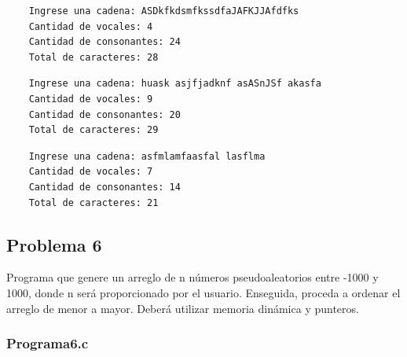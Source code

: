 \documentclass{article}
\begin{document}
	\begin{lstlisting}
	Ingrese una cadena: ASDkfkdsmfkssdfaJAFKJJAfdfks
	Cantidad de vocales: 4
	Cantidad de consonantes: 24
	Total de caracteres: 28
	\end{lstlisting}
	
	\begin{lstlisting}
	Ingrese una cadena: huask asjfjadknf asASnJSf akasfa
	Cantidad de vocales: 9
	Cantidad de consonantes: 20
	Total de caracteres: 29
	\end{lstlisting}
	
	\begin{lstlisting}
	Ingrese una cadena: asfmlamfaasfal lasflma
	Cantidad de vocales: 7
	Cantidad de consonantes: 14
	Total de caracteres: 21
	\end{lstlisting}
	
	\subsection{Problema 6}
	
	Programa que genere un arreglo de n números pseudoaleatorios entre -1000 y 1000, donde n será proporcionado por el usuario. Enseguida, proceda a ordenar el arreglo de menor a mayor. Deberá utilizar memoria dinámica y punteros.
	
	\subsubsection{Programa6.c}
	
\end{document}
